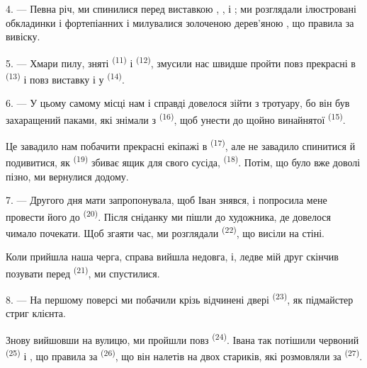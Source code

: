 \VUsaut{3.0mm}

4. --- Певна річ, ми спинилися перед виставкою ,
,  і ; ми розглядали
ілюстровані обкладинки  і фортепіанних  і милувалися
золоченою дерев'яною , що правила за вивіску.

5. --- Хмари пилу, зняті  \textsuperscript{(11)} і
 \textsuperscript{(12)}, змусили нас швидше пройти
повз прекрасні  в 
\textsuperscript{(13)} і повз виставку  і  у
 \textsuperscript{(14)}.

6. --- У цьому самому місці нам і справді довелося зійти з тротуару, бо він був
захаращений паками, які знімали з 
\textsuperscript{(16)}, щоб унести до щойно винайнятої 
\textsuperscript{(15)}.

Це завадило нам побачити прекрасні екіпажі в 
\textsuperscript{(17)}, але не завадило спинитися й подивитися, як
 \textsuperscript{(19)} збиває ящик для свого сусіда,
 \textsuperscript{(18)}. Потім, що
було вже доволі пізно, ми вернулися додому.

\VUsaut{3.0mm}

7. --- Другого дня мати запропонувала, щоб Іван знявся, і попросила мене
провести його до  \textsuperscript{(20)}. Після сніданку ми
пішли до  художника, де довелося чимало почекати. Щоб згаяти час,
ми розглядали  \textsuperscript{(22)}, що висіли на стіні.

Коли прийшла наша черга, справа вийшла недовга, і, ледве мій друг скінчив
позувати перед  \textsuperscript{(21)}, ми спустилися.

8. --- На першому поверсі ми побачили крізь відчинені двері 
\textsuperscript{(23)}, як підмайстер стриг клієнта.

Знову вийшовши на вулицю, ми пройшли повз 
\textsuperscript{(24)}. Івана так потішили червоний 
\textsuperscript{(25)} і , що правила за 
\textsuperscript{(26)}, що він налетів на двох стариків, які розмовляли за
 \textsuperscript{(27)}.


